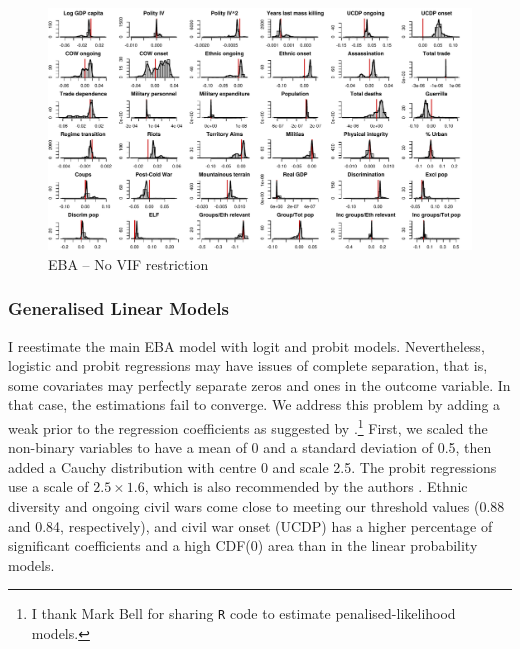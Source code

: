 \clearpage
\begin{figure}
    \centering
    \includegraphics[width=\textwidth]{images/mk-no-vif.pdf}
    \caption{EBA -- No VIF restriction}
    \label{fig:mk-no-vif}
\end{figure}
\clearpage

\subsubsection{Generalised Linear Models}

I reestimate the main EBA model with logit and probit models. Nevertheless, logistic and probit regressions may have issues of complete separation, that is, some covariates may perfectly separate zeros and ones in the outcome variable. In that case, the estimations fail to converge. We address this problem by adding a weak prior to the regression coefficients as suggested by \citet{gelman2008weakly}.\footnote{I thank Mark Bell for sharing \texttt{R} code to estimate penalised-likelihood models.} First, we scaled the non-binary variables to have a mean of 0 and a standard deviation of 0.5, then added a Cauchy distribution with centre 0 and scale 2.5. The probit regressions use a scale of $2.5 \times 1.6$, which is also recommended by the authors \citep{arm2017rpackage}. Ethnic diversity and ongoing civil wars come close to meeting our threshold values (0.88 and 0.84, respectively), and civil war onset (UCDP) has a higher percentage of significant coefficients and a high CDF(0) area than in the linear probability models.

\vspace{1cm}

